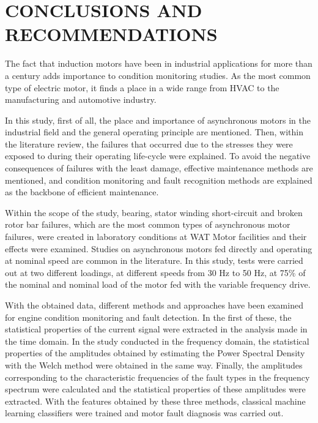 \chapter{CONCLUSIONS AND RECOMMENDATIONS}\label{Ch5}

The fact that induction motors have been in industrial applications for more than a century adds importance to condition monitoring studies. As the most common type of electric motor, it finds a place in a wide range from HVAC to the manufacturing and automotive industry.

In this study, first of all, the place and importance of asynchronous motors in the industrial field and the general operating principle are mentioned. Then, within the literature review, the failures that occurred due to the stresses they were exposed to during their operating life-cycle were explained. To avoid the negative consequences of failures with the least damage, effective maintenance methods are mentioned, and condition monitoring and fault recognition methods are explained as the backbone of efficient maintenance.

Within the scope of the study, bearing, stator winding short-circuit and broken rotor bar failures, which are the most common types of asynchronous motor failures, were created in laboratory conditions at WAT Motor facilities and their effects were examined. Studies on asynchronous motors fed directly and operating at nominal speed are common in the literature. In this study, tests were carried out at two different loadings, at different speeds from 30 Hz to 50 Hz, at 75\% of the nominal and nominal load of the motor fed with the variable frequency drive.

With the obtained data, different methods and approaches have been examined for engine condition monitoring and fault detection. In the first of these, the statistical properties of the current signal were extracted in the analysis made in the time domain. In the study conducted in the frequency domain, the statistical properties of the amplitudes obtained by estimating the Power Spectral Density with the Welch method were obtained in the same way. Finally, the amplitudes corresponding to the characteristic frequencies of the fault types in the frequency spectrum were calculated and the statistical properties of these amplitudes were extracted. With the features obtained by these three methods, classical machine learning classifiers were trained and motor fault diagnosis was carried out.

